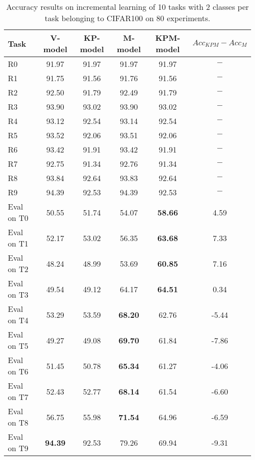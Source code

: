 \begin{table}[H]
\centering
\begin{tabular}{lccccc}
\toprule
Task  & V-model & KP-model & M-model & KPM-model & $Acc_{KPM}-Acc_{M}$ \\
\midrule
R0 & 91.97 & 91.97 & 91.97 & 91.97 & $-$ \\
R1 & 91.75 & 91.56 & 91.76 & 91.56 & $-$ \\
R2 & 92.50 & 91.79 & 92.49 & 91.79 & $-$ \\
R3 & 93.90 & 93.02 & 93.90 & 93.02 & $-$ \\
R4 & 93.12 & 92.54 & 93.14 & 92.54 & $-$ \\
R5 & 93.52 & 92.06 & 93.51 & 92.06 & $-$ \\
R6 & 93.42 & 91.91 & 93.42 & 91.91 & $-$ \\
R7 & 92.75 & 91.34 & 92.76 & 91.34 & $-$ \\
R8 & 93.84 & 92.64 & 93.83 & 92.64 & $-$ \\
R9 & 94.39 & 92.53 & 94.39 & 92.53 & $-$ \\

 \hline 
Eval on T0 & 50.55 & 51.74 & 54.07 & \textbf{58.66} & 4.59 \\
Eval on T1 & 52.17 & 53.02 & 56.35 & \textbf{63.68} & 7.33 \\
Eval on T2 & 48.24 & 48.99 & 53.69 & \textbf{60.85} & 7.16 \\
Eval on T3 & 49.54 & 49.12 & 64.17 & \textbf{64.51} & 0.34 \\
Eval on T4 & 53.29 & 53.59 & \textbf{68.20} & 62.76 & -5.44 \\
Eval on T5 & 49.27 & 49.08 & \textbf{69.70} & 61.84 & -7.86 \\
Eval on T6 & 51.45 & 50.78 & \textbf{65.34} & 61.27 & -4.06 \\
Eval on T7 & 52.43 & 52.77 & \textbf{68.14} & 61.54 & -6.60 \\
Eval on T8 & 56.75 & 55.98 & \textbf{71.54} & 64.96 & -6.59 \\
Eval on T9 & \textbf{94.39} & 92.53 & 79.26 & 69.94 & -9.31 \\
\bottomrule
\end{tabular}
\caption{Accuracy results on incremental learning of 10 tasks with 2 classes per task belonging to CIFAR100 on 80 experiments.}
\end{table}
